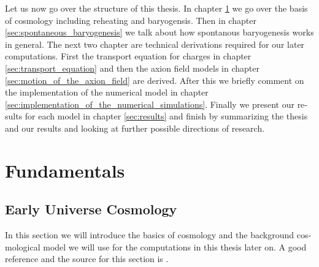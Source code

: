 \documentclass[master,       %
               twoside,        %
               BCOR10mm,       %
               english,ngerman, %
               ]{GAUBM}
\begin{document}
\begin{otherlanguage}{english}
Let us now go over the structure of this thesis.
In chapter \ref{sec:fundermentals} we go over the basis of cosmology including reheating and baryogensis.
Then in chapter \ref{sec:spontaneous_baryogenesis} we talk about how spontanous baryogenesis works in general.
The next two chapter are technical derivations required for our later computations. First the transport equation for charges in chapter \ref{sec:transport_equation} and then the axion field models in chapter \ref{sec:motion_of_the_axion_field} are derived.
After this we briefly comment on the implementation of the numerical model in chapter \ref{sec:implementation_of_the_numerical_simulations}.
Finally we present our results for each model in chapter \ref{sec:results}
and finish by summarizing the thesis and our results and looking at further possible directions of research.

\chapter{Fundamentals}
\label{sec:fundermentals}

\section{Early Universe Cosmology}
In this section we will introduce the basics of cosmology and the background cosmological model we will use for the computations in this thesis later on.
A good reference and the source for this section is \cite{the_early_universe_kolb_and_turner}.


\end{otherlanguage}
\end{document}
